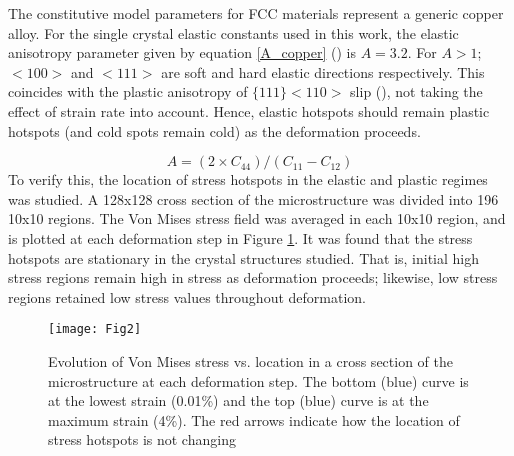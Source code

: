 \documentclass[preprint,1p,times,authoryear]{elsarticle}%
\begin{document}
The constitutive model parameters for FCC materials represent a generic copper alloy.  For the single crystal elastic constants used in this work, the elastic anisotropy parameter given by equation \ref{A_copper} (\cite{zener1948elasticity}) is $A = 3.2$. For $A > 1$; $<100>$ and $<111>$ are soft and hard elastic directions respectively. This coincides with the plastic anisotropy of $\{111\}<110>$ slip (\cite{Lebensohn2012}), not taking the effect of strain rate into account. Hence, elastic hotspots should remain plastic hotspots (and cold spots remain cold) as the deformation proceeds.

\begin{equation}
A = (2\times C_{44})/(C_{11} - C_{12})
\label{A_copper}
\end{equation}
To verify this, the location of stress hotspots in the elastic and plastic regimes was studied. A 128x128 cross section of the microstructure was divided into 196 10x10 regions. The Von Mises stress field was averaged in each 10x10 region, and is plotted at each deformation step in Figure \ref{HotspotEvolve}. It was found that the stress hotspots are stationary in the crystal structures studied. That is, initial high stress regions remain high in stress as deformation proceeds; likewise, low stress regions retained low stress values throughout deformation.

\begin{figure}[!hbt]
\centering
    \texttt{[image: Fig2]}%
    \caption{Evolution of Von Mises stress vs. location in a cross section of the microstructure at each deformation step. The bottom (blue) curve is at the lowest strain (0.01\%) and the top (blue) curve is at the maximum strain (4\%). The red arrows indicate how the location of stress hotspots is not changing}
    \label{HotspotEvolve}
\end{figure}
\end{document}
